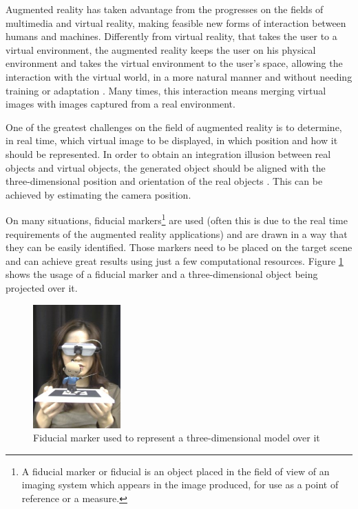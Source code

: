 \documentclass[msc, a4paper, classic, en]{ufbathesis}
\begin{document}
Augmented reality has taken advantage from the progresses on the fields of multimedia and virtual reality, making feasible new forms of
interaction between humans and machines. Differently from virtual reality, that takes the user to a virtual environment, the augmented
reality keeps the user on his physical environment and takes the virtual environment to the user's space, allowing the interaction with
the virtual world, in a more natural manner and without needing training or adaptation \cite{tori2006fundamentos}. Many times, this interaction means
merging virtual images with images captured from a real environment.

One of the greatest challenges on the field of augmented reality is to determine, in real time, which virtual image to be displayed,
in which position and how it should be represented. In order to obtain an integration illusion between real objects and virtual objects,
the generated object should be aligned with the three-dimensional position and orientation of the real objects \cite{gallo11}. This can be achieved
by estimating the camera position.

On many situations, fiducial markers\footnote{A fiducial marker or fiducial is an object placed in the field of view of an imaging system which appears in the image produced, for use as a point of reference or a measure.} are used (often this is due to the real time requirements of the augmented reality applications) \cite{azuma} and are drawn in a way that they can be easily identified. Those markers need to be placed on the target scene and can achieve great results using just a few computational resources. Figure \ref{fig:fiducial_marker} shows the usage of a fiducial marker and a three-dimensional object being projected over it.

\begin{figure}
\label{fig:fiducial_marker}
\centering
\includegraphics[width=0.3\textwidth]{images/fiducial_marker.png}
\caption{Fiducial marker used to represent a three-dimensional model over it \cite{artoolkit}}
\end{figure}
\end{document}
